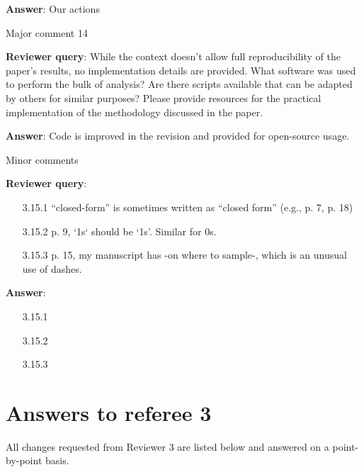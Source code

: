 \documentclass[a4paper]{article}
\newcounter{reviewer}
\def\reply{\textbf{Reviewer query}}
\def\action{\textbf{Answer}}
\begin{document}
\begin{answers}
\action: Our actions

\item{Major comment 14}\label{r2c14}

\reply: While the context doesn’t allow full reproducibility of the paper’s results, no implementation details are provided. What software was used to perform the bulk of analysis? Are there scripts available that can be adapted by others for similar purposes? Please provide resources for the practical implementation of the methodology discussed in the paper.

\action: Code is improved in the revision and provided for open-source usage.

\item{Minor comments}\label{r2cminor}

\reply: \begin{itemize}[noitemsep,topsep=0pt,parsep=0pt,partopsep=0pt]

\item[3.15.1] “closed-form” is sometimes written as “closed form” (e.g., p. 7, p. 18)

\item[3.15.2] p. 9, `1s` should be ‘1s’. Similar for 0s.

\item[3.15.3] p. 15, my manuscript has -on where to sample-, which is an unusual use of dashes.

\end{itemize}

\action:
\begin{itemize}[noitemsep,topsep=0pt,parsep=0pt,partopsep=0pt]

\item[3.15.1] 
\item[3.15.2] 
\item[3.15.3] 

\end{itemize}

\end{answers}

\section*{Answers to referee 3}
All changes requested from Reviewer 3 are listed below and answered on a point-by-point basis.

\setcounter{reviewer}{4}
\end{document}
